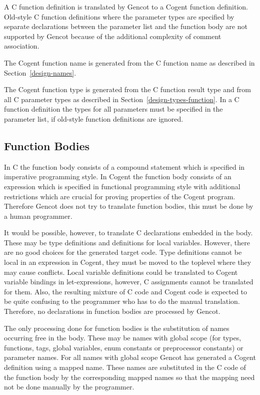 
A C function definition is translated by Gencot to a Cogent function definition. Old-style C function definitions
where the parameter types are specified by separate declarations between the parameter list and the function body
are not supported by Gencot because of the additional complexity of comment association.

The Cogent function name is generated from the C function name as described in Section~\ref{design-names}.

The Cogent function type is generated from the C function result type and from all C parameter types as described
in Section~\ref{design-types-function}. In a C
function definition the types for all parameters must be specified in the parameter list, if old-style function
definitions are ignored.

\subsection{Function Bodies}
\label{design-fundefs-body}

In C the function body consists of a compound statement which is specified in imperative programming style. In Cogent
the function body consists of an expression which is specified in functional programming style with additional 
restrictions which are crucial for proving properties of the Cogent program. Therefore Gencot does not try
to translate function bodies, this must be done by a human programmer.

It would be possible, however, to translate C declarations embedded in the body. These may be type definitions
and definitions for local variables. However, there are no good choices for the generated target code. Type
definitions cannot be local in an expression in Cogent, they must be moved to the toplevel where they may cause
conflicts. Local variable definitions could be translated to Cogent variable bindings in let-expressions, however,
C assignments cannot be translated for them. Also, the resulting mixture of C code and Cogent code is expected 
to be quite confusing to the programmer who has to do the manual translation. Therefore, no declarations in 
function bodies are processed by Gencot.

The only processing done for function bodies is the substitution of names occurring free in the body. These may
be names with global scope (for types, functions, tags, global variables, enum constants or preprocessor constants)
or parameter names. For all names with global scope Gencot has generated a Cogent definition using a mapped name.
These names are substituted in the C code of the function body by the corresponding mapped names so that the 
mapping need not be done manually by the programmer.

